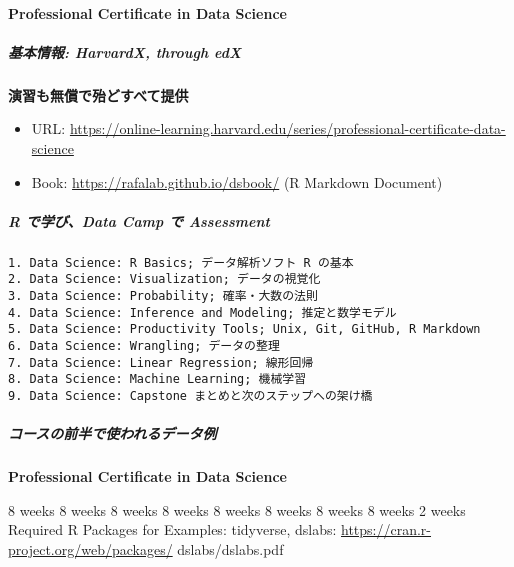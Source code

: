 \documentclass[
]{bxjsbook}
\providecommand{\tightlist}{%
  \setlength{\itemsep}{0pt}\setlength{\parskip}{0pt}}
\theoremstyle{definition}
\theoremstyle{definition}
\theoremstyle{definition}
\theoremstyle{definition}
\theoremstyle{remark}
\begin{document}
\hypertarget{professional-certificate-in-data-science}{%
\paragraph{Professional Certificate in Data Science}\label{professional-certificate-in-data-science}}

\hypertarget{ux57faux672cux60c5ux5831-harvardx-through-edx-1}{%
\subparagraph{基本情報: HarvardX, through edX}\label{ux57faux672cux60c5ux5831-harvardx-through-edx-1}}

\textbf{演習も無償で殆どすべて提供}

\begin{itemize}
\tightlist
\item
  URL: \url{https://online-learning.harvard.edu/series/professional-certificate-data-science}
\item
  Book: \url{https://rafalab.github.io/dsbook/} (R Markdown Document)
\end{itemize}

\hypertarget{r-ux3067ux5b66ux3073data-camp-ux3067-assessment-1}{%
\subparagraph{R で学び、Data Camp で Assessment}\label{r-ux3067ux5b66ux3073data-camp-ux3067-assessment-1}}

\begin{verbatim}
1. Data Science: R Basics; データ解析ソフト R の基本
2. Data Science: Visualization; データの視覚化
3. Data Science: Probability; 確率・大数の法則
4. Data Science: Inference and Modeling; 推定と数学モデル
5. Data Science: Productivity Tools; Unix, Git, GitHub, R Markdown 
6. Data Science: Wrangling; データの整理
7. Data Science: Linear Regression; 線形回帰
8. Data Science: Machine Learning; 機械学習
9. Data Science: Capstone まとめと次のステップへの架け橋
\end{verbatim}

\hypertarget{ux30b3ux30fcux30b9ux306eux524dux534aux3067ux4f7fux308fux308cux308bux30c7ux30fcux30bfux4f8b-1}{%
\subparagraph{コースの前半で使われるデータ例}\label{ux30b3ux30fcux30b9ux306eux524dux534aux3067ux4f7fux308fux308cux308bux30c7ux30fcux30bfux4f8b-1}}

\textbf{Professional Certificate in Data Science}

8 weeks 8 weeks 8 weeks 8 weeks 8 weeks 8 weeks 8 weeks 8 weeks 2 weeks
Required R Packages for Examples: tidyverse, dslabs: \url{https://cran.r-project.org/web/packages/} dslabs/dslabs.pdf
\end{document}
